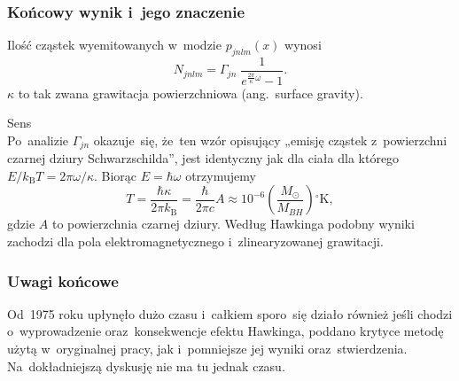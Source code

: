 \documentclass[10pt,t]{beamer}
\begin{document}
\begin{frame}
  \frametitle{Końcowy wynik i~jego znaczenie}


  Ilość cząstek wyemitowanych w~modzie $p_{ j n l m }( x )$ wynosi
  \begin{equation}
    \label{eq:Promieniowanie-Hawkinga-29}
    N_{ j n l m } =
    \Gamma_{ j n } \; \frac{ 1 }{ e^{  \frac{ 2 \pi }{ \kappa } \omega } - 1 }.
  \end{equation}
  $\kappa$ to tak zwana grawitacja powierzchniowa (ang.~surface
  gravity).

  Sens \\
  Po~analizie $\Gamma_{ j n }$ okazuje~się, że~ten wzór opisujący
  „emisję cząstek z~powierzchni czarnej dziury Schwarzschilda”,
  jest identyczny jak dla ciała dla którego
  $E / k_{ \textrm{B} } T = 2\pi \omega / \kappa$. Biorąc
  $E = \hbar \omega$ otrzymujemy
  \begin{equation}
    \label{eq:HawkingPromieniowanie-30}
    T =
    \frac{ \hbar \kappa }{ 2\pi k_{ \mathrm{B} } } =
    \frac{ \hbar }{ 2\pi c } A \approx
    10^{ -6 } \left( \frac{ M_{ \odot } }{ M_{ BH } } \right)
    {}^{ \circ } \mathrm{K},
  \end{equation}
  gdzie $A$ to powierzchnia czarnej dziury. Według Hawkinga podobny
  wyniki zachodzi dla pola elektromagnetycznego i~zlinearyzowanej
  grawitacji.

\end{frame}





\begin{frame}
  \frametitle{Uwagi końcowe}


  Od~1975 roku upłynęło dużo czasu i~całkiem sporo~się działo
  również jeśli chodzi o~wyprowadzenie oraz~konsekwencje efektu
  Hawkinga, poddano krytyce metodę użytą w~oryginalnej pracy, jak
  i~pomniejsze jej wyniki oraz~stwierdzenia. Na~dokładniejszą
  dyskusję nie ma tu jednak czasu.

\end{frame}










\appendix
\end{document}
